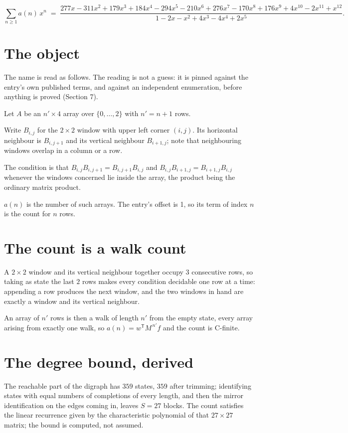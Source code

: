 \documentclass[11pt]{article}
\theoremstyle{definition}
\begin{document}
\[\sum_{n \ge 1} a(n)\,x^n \;=\; \frac{277x - 311x^{2} + 179x^{3} + 184x^{4} - 294x^{5} - 210x^{6} + 276x^{7} - 170x^{8} + 176x^{9} + 4x^{10} - 2x^{11} + x^{12}}{1 - 2x - x^{2} + 4x^{3} - 4x^{4} + 2x^{5}}.\]

\section{The object}

The name is read as follows. The reading is not a guess: it is pinned against the entry's own published terms, and against an independent enumeration, before anything is proved (Section 7).

Let $A$ be an $n' \times 4$ array over $\{0,\dots,2\}$ with $n' = n + 1$ rows.

Write $B_{i,j}$ for the $2\times2$ window with upper left corner $(i,j)$. Its horizontal neighbour is $B_{i,j+1}$ and its vertical neighbour $B_{i+1,j}$; note that neighbouring windows overlap in a column or a row.

The condition is that $B_{i,j}B_{i,j+1} = B_{i,j+1}B_{i,j}$ and $B_{i,j}B_{i+1,j} = B_{i+1,j}B_{i,j}$ whenever the windows concerned lie inside the array, the product being the ordinary matrix product.

$a(n)$ is the number of such arrays. The entry's offset is 1, so its term of index $n$ is the count for $n$ rows.

\section{The count is a walk count}

A $2\times2$ window and its vertical neighbour together occupy $3$ consecutive rows, so taking as state the last $2$ rows makes every condition decidable one row at a time: appending a row produces the next window, and the two windows in hand are exactly a window and its vertical neighbour.

An array of $n'$ rows is then a walk of length $n'$ from the empty state, every array arising from exactly one walk, so $a(n) = w^{\mathsf T}M^{\,n'}f$ and the count is C-finite.

\section{The degree bound, derived}

The reachable part of the digraph has $359$ states, $359$ after trimming; identifying states with equal numbers of completions of every length, and then the mirror identification on the edges coming in, leaves $S = 27$ blocks. The count satisfies the linear recurrence given by the characteristic polynomial of that $27\times27$ matrix; the bound is computed, not assumed.
\end{document}
